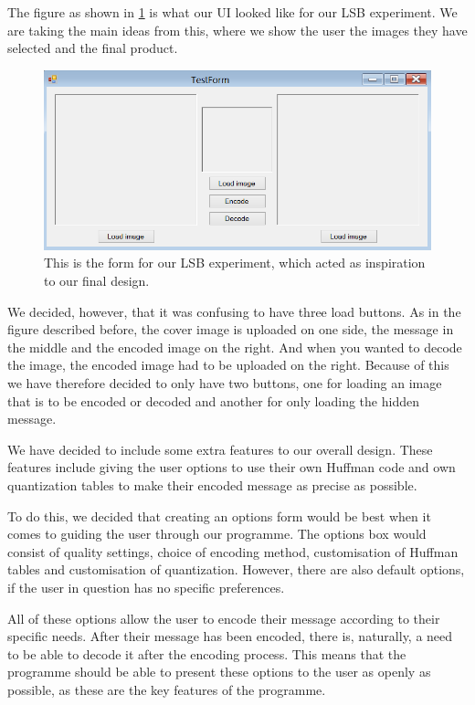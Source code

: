 The figure as shown in \ref{fig:LSBForm} is what our UI looked like for our LSB experiment.
We are taking the main ideas from this, where we show the user the images they have selected and the final product.
\begin{figure}
	\centering
	\includegraphics[width=1\textwidth]{figures/LSBForm.png}
	\caption{This is the form for our LSB experiment, which acted as inspiration to our final design.}
	\label{fig:LSBForm}
\end{figure}
We decided, however, that it was confusing to have three load buttons.
As in the figure described before, the cover image is uploaded on one side, the message in the middle and the encoded image on the right.
And when you wanted to decode the image, the encoded image had to be uploaded on the right.
Because of this we have therefore decided to only have two buttons, one for loading an image that is to be encoded or decoded and another for only loading the hidden message.

We have decided to include some extra features to our overall design.
These features include giving the user options to use their own Huffman code and own quantization tables to make their encoded message as precise as possible.

To do this, we decided that creating an options form would be best when it comes to guiding the user through our programme.
The options box would consist of quality settings, choice of encoding method, customisation of Huffman tables and customisation of quantization.
However, there are also default options, if the user in question has no specific preferences.

All of these options allow the user to encode their message according to their specific needs.
After their message has been encoded, there is, naturally, a need to be able to decode it after the encoding process.
This means that the programme should be able to present these options to the user as openly as possible, as these are the key features of the programme.

